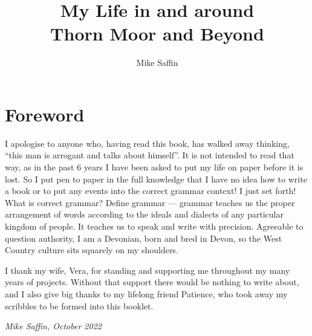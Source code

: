 \documentclass[twoside,11pt,a5paper]{memoir}
\title{My Life in and around\\Thorn Moor and Beyond}
\author{Mike Saffin}
\date{}
\begin{document}
% 

\maketitle

\chapter*{Foreword}

I apologise to anyone who, having read this book, has walked away thinking,
``this man is arrogant and talks about himself''. It is not intended to read
that way, as in the past 6 years I have been asked to put my life on paper
before it is lost. So I put pen to paper in the full knowledge that I have no
idea how to write a book or to put any events into the correct grammar
context! I just set forth! What is correct grammar? Define grammar --- grammar
teaches us the proper arrangement of words according to the ideals and dialects
of any particular kingdom of people. It teaches us to speak and write with
precision. Agreeable to question authority, I am a Devonian, born and bred in
Devon, so the West Country culture sits squarely on my shoulders.

I thank my wife, Vera, for standing and supporting me throughout my many years
of projects. Without that support there would be nothing to write about, and I
also give big thanks to my lifelong friend Patience, who took away my scribbles
to be formed into this booklet.

\bigskip

\emph{Mike Saffin, October 2022}

\chapter{}


\chapter{}

\chapter{}

\chapter{}

\chapter{}


\end{document}
